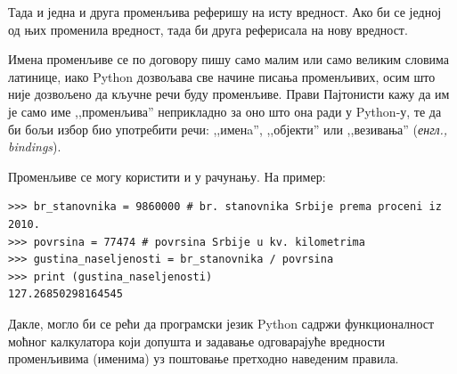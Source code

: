 Тада и једна и друга променљива реферишу на исту вредност. Ако би се једној од њих променила вредност, тада би друга реферисала на нову вредност.

Имена променљиве се по договору пишу само малим или само великим словима латинице, иако Python дозвољава све начине писања променљивих, осим што није дозвољено да кључне речи буду променљиве. Прави Пајтонисти \cite{pythonista} кажу да им је само име ,,променљива'' неприкладно за оно што она ради у Python-у, те да би бољи избор био употребити речи: ,,именa'',  ,,објекти'' или ,,везивања'' (\emph{енгл., bindings}).

Променљиве се могу користити и у рачунању. На пример:

\begin{lstlisting}[caption = Пример коришћења променљивих, label = variables]
>>> br_stanovnika = 9860000 # br. stanovnika Srbije prema proceni iz 2010.
>>> povrsina = 77474 # povrsina Srbije u kv. kilometrima
>>> gustina_naseljenosti = br_stanovnika / povrsina
>>> print (gustina_naseljenosti)
127.26850298164545
\end{lstlisting}

Дакле, могло би се рећи да програмски језик Python садржи функционалност моћног калкулатора који допушта и задавање одговарајуће вредности променљивима (именима) уз поштовање претходно наведеним правила.
